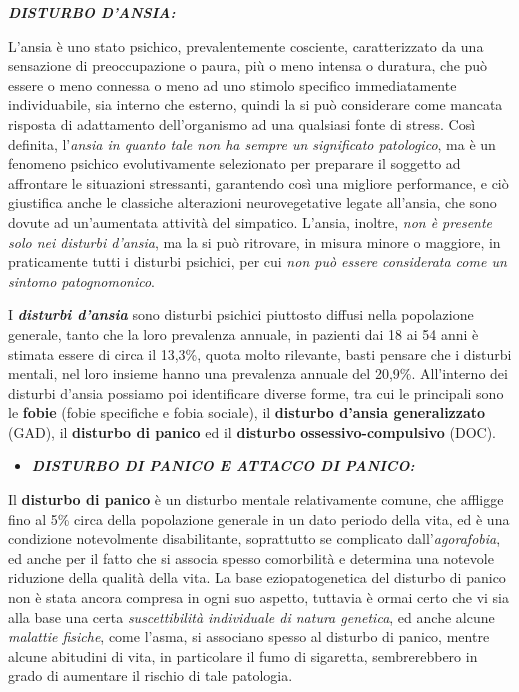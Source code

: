 \documentclass[]{article}
\date{}
\begin{document}
\textbf{\emph{DISTURBO D'ANSIA:}}

L'ansia è uno stato psichico, prevalentemente cosciente, caratterizzato
da una sensazione di preoccupazione o paura, più o meno intensa o
duratura, che può essere o meno connessa o meno ad uno stimolo specifico
immediatamente individuabile, sia interno che esterno, quindi la si può
considerare come mancata risposta di adattamento dell'organismo ad una
qualsiasi fonte di stress. Così definita, l'\emph{ansia in quanto tale
non ha sempre un significato patologico}, ma è un fenomeno psichico
evolutivamente selezionato per preparare il soggetto ad affrontare le
situazioni stressanti, garantendo così una migliore performance, e ciò
giustifica anche le classiche alterazioni neurovegetative legate
all'ansia, che sono dovute ad un'aumentata attività del simpatico.
L'ansia, inoltre, \emph{non è presente solo nei disturbi d'ansia}, ma la
si può ritrovare, in misura minore o maggiore, in praticamente tutti i
disturbi psichici, per cui \emph{non può essere considerata come un
sintomo patognomonico}.

I \textbf{\emph{disturbi d'ansia}} sono disturbi psichici piuttosto
diffusi nella popolazione generale, tanto che la loro prevalenza
annuale, in pazienti dai 18 ai 54 anni è stimata essere di circa il
13,3\%, quota molto rilevante, basti pensare che i disturbi mentali, nel
loro insieme hanno una prevalenza annuale del 20,9\%. All'interno dei
disturbi d'ansia possiamo poi identificare diverse forme, tra cui le
principali sono le \textbf{fobie} (fobie specifiche e fobia sociale), il
\textbf{disturbo d'ansia generalizzato} (GAD), il \textbf{disturbo di
panico} ed il \textbf{disturbo} \textbf{ossessivo-compulsivo} (DOC).

\begin{itemize}
\item
  \textbf{\emph{DISTURBO DI PANICO E ATTACCO DI PANICO:}}
\end{itemize}

Il \textbf{disturbo di panico} è un disturbo mentale relativamente
comune, che affligge fino al 5\% circa della popolazione generale in un
dato periodo della vita, ed è una condizione notevolmente disabilitante,
soprattutto se complicato dall'\emph{agorafobia}, ed anche per il fatto
che si associa spesso comorbilità e determina una notevole riduzione
della qualità della vita. La base eziopatogenetica del disturbo di
panico non è stata ancora compresa in ogni suo aspetto, tuttavia è ormai
certo che vi sia alla base una certa \emph{suscettibilità individuale di
natura genetica}, ed anche alcune \emph{malattie fisiche}, come l'asma,
si associano spesso al disturbo di panico, mentre alcune abitudini di
vita, in particolare il fumo di sigaretta, sembrerebbero in grado di
aumentare il rischio di tale patologia.
\end{document}
